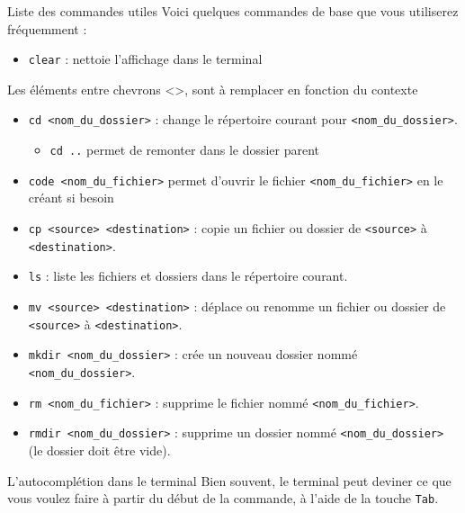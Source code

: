 \begin{UPSTIinfor}{Liste des commandes utiles}
	Voici quelques commandes de base que vous utiliserez fréquemment :
	\begin{itemize}
		\item \texttt{clear} : nettoie l'affichage dans le terminal
	\end{itemize}
	Les éléments entre chevrons <>, sont à remplacer en fonction du contexte
	\begin{itemize}
		\item \texttt{cd <nom\_du\_dossier>} : change le répertoire courant pour \texttt{<nom\_du\_dossier>}.
		      \begin{itemize}
			      \item \texttt{cd ..} permet de remonter dans le dossier parent
		      \end{itemize}
		\item \texttt{code <nom\_du\_fichier>} permet d'ouvrir le fichier \texttt{<nom\_du\_fichier>} en le créant si besoin
		\item \texttt{cp <source> <destination>} : copie un fichier ou dossier de \texttt{<source>} à \texttt{<destination>}.
		\item \texttt{ls} : liste les fichiers et dossiers dans le répertoire courant.
		\item \texttt{mv <source> <destination>} : déplace ou renomme un fichier ou dossier de \texttt{<source>} à \texttt{<destination>}.
		\item \texttt{mkdir <nom\_du\_dossier>} : crée un nouveau dossier nommé \texttt{<nom\_du\_dossier>}.
		\item \texttt{rm <nom\_du\_fichier>} : supprime le fichier nommé \texttt{<nom\_du\_fichier>}.
		\item \texttt{rmdir <nom\_du\_dossier>} : supprime un dossier nommé \texttt{<nom\_du\_dossier>} (le dossier doit être vide).
	\end{itemize}
\end{UPSTIinfor}

\begin{UPSTIinfor}{L'autocomplétion dans le terminal}
	Bien souvent, le terminal peut deviner ce que vous voulez faire à partir du début de la commande, à l'aide de la touche \texttt{Tab}.
\end{UPSTIinfor}

